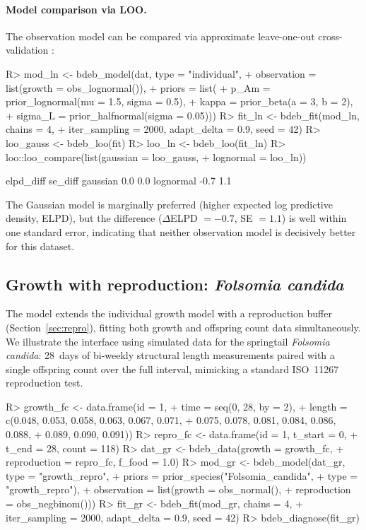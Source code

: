 \documentclass[article,shortnames]{jss}
\begin{document}
\paragraph{Model comparison via LOO.}
The observation model can be compared via approximate
leave-one-out cross-validation \citep{VehtariLOO2017}:
\begin{CodeChunk}
\begin{CodeInput}
R> mod_ln <- bdeb_model(dat, type = "individual",
+    observation = list(growth = obs_lognormal()),
+    priors = list(
+      p_Am  = prior_lognormal(mu = 1.5, sigma = 0.5),
+      kappa = prior_beta(a = 3, b = 2),
+      sigma_L = prior_halfnormal(sigma = 0.05)))
R> fit_ln <- bdeb_fit(mod_ln, chains = 4,
+    iter_sampling = 2000, adapt_delta = 0.9, seed = 42)
R> loo_gauss <- bdeb_loo(fit)
R> loo_ln    <- bdeb_loo(fit_ln)
R> loo::loo_compare(list(gaussian = loo_gauss,
+    lognormal = loo_ln))
\end{CodeInput}
\begin{CodeOutput}
          elpd_diff se_diff
gaussian   0.0       0.0
lognormal -0.7       1.1
\end{CodeOutput}
\end{CodeChunk}
\noindent
The Gaussian model is marginally preferred (higher expected log
predictive density, ELPD), but the
difference ($\Delta$ELPD $= -0.7$, SE $= 1.1$) is well within one
standard error, indicating that neither observation model is
decisively better for this dataset.

\subsection[Growth with reproduction: Folsomia candida]{%
  Growth with reproduction: \emph{Folsomia candida}}
  \label{sec:ex_repro}

The  model extends the individual growth model
with a reproduction buffer (Section~\ref{sec:repro}), fitting both
growth and offspring count data simultaneously.  We illustrate the
interface using simulated data for the springtail \emph{Folsomia
candida}: 28~days of bi-weekly structural length measurements
paired with a single offspring count over the full interval, mimicking
a standard ISO~11267 reproduction test.

\begin{CodeChunk}
\begin{CodeInput}
R> growth_fc <- data.frame(id = 1,
+    time = seq(0, 28, by = 2),
+    length = c(0.048, 0.053, 0.058, 0.063, 0.067, 0.071,
+               0.075, 0.078, 0.081, 0.084, 0.086, 0.088,
+               0.089, 0.090, 0.091))
R> repro_fc <- data.frame(id = 1, t_start = 0,
+    t_end = 28, count = 118)
R> dat_gr <- bdeb_data(growth = growth_fc,
+    reproduction = repro_fc, f_food = 1.0)
R> mod_gr <- bdeb_model(dat_gr, type = "growth_repro",
+    priors = prior_species("Folsomia_candida",
+      type = "growth_repro"),
+    observation = list(growth = obs_normal(),
+      reproduction = obs_negbinom()))
R> fit_gr <- bdeb_fit(mod_gr, chains = 4,
+    iter_sampling = 2000, adapt_delta = 0.9, seed = 42)
R> bdeb_diagnose(fit_gr)
\end{CodeInput}
\end{CodeChunk}
\end{document}
